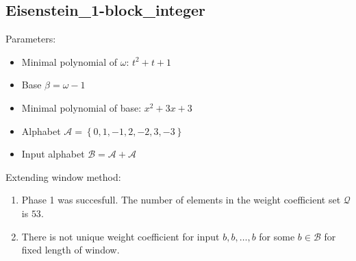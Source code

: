 \subsection{ Eisenstein\_1-block\_integer }

\label{subsec:Eisenstein1-blockinteger}

Parameters:
\begin{itemize}
    \item Minimal polynomial of $\omega$: $ t^{2} + t + 1 $
    \item Base $\beta= \omega - 1 $
    \item Minimal polynomial of base: $ x^{2} + 3x + 3 $
    \item Alphabet $\mathcal{A} =\left\{0, 1, -1, 2, -2, 3, -3\right\}$
    \item Input alphabet $\mathcal{B} =\mathcal{A}+ \mathcal{A}$
\end{itemize}


\noindent Extending window method:
\begin{enumerate}
    \item Phase 1 was succesfull.
The number of elements in the weight coefficient set $\mathcal{Q}$ is $53$.

    \item There is not unique weight coefficient for input $b,b,\dots,b$ for some $b\in\mathcal{B}$ for fixed length of window.

\end{enumerate}
